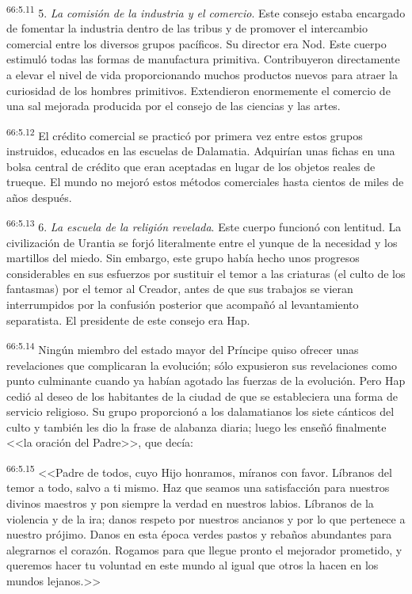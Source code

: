 \par
\textsuperscript{66:5.11} 5. \textit{La comisión de la industria y el comercio}. Este consejo estaba encargado de fomentar la industria dentro de las tribus y de promover el intercambio comercial entre los diversos grupos pacíficos. Su director era Nod. Este cuerpo estimuló todas las formas de manufactura primitiva. Contribuyeron directamente a elevar el nivel de vida proporcionando muchos productos nuevos para atraer la curiosidad de los hombres primitivos. Extendieron enormemente el comercio de una sal mejorada producida por el consejo de las ciencias y las artes.

\par
\textsuperscript{66:5.12} El crédito comercial se practicó por primera vez entre estos grupos instruidos, educados en las escuelas de Dalamatia. Adquirían unas fichas en una bolsa central de crédito que eran aceptadas en lugar de los objetos reales de trueque. El mundo no mejoró estos métodos comerciales hasta cientos de miles de años después.

\par
\textsuperscript{66:5.13} 6. \textit{La escuela de la religión revelada}. Este cuerpo funcionó con lentitud. La civilización de Urantia se forjó literalmente entre el yunque de la necesidad y los martillos del miedo. Sin embargo, este grupo había hecho unos progresos considerables en sus esfuerzos por sustituir el temor a las criaturas (el culto de los fantasmas) por el temor al Creador, antes de que sus trabajos se vieran interrumpidos por la confusión posterior que acompañó al levantamiento separatista. El presidente de este consejo era Hap.

\par
\textsuperscript{66:5.14} Ningún miembro del estado mayor del Príncipe quiso ofrecer unas revelaciones que complicaran la evolución; sólo expusieron sus revelaciones como punto culminante cuando ya habían agotado las fuerzas de la evolución. Pero Hap cedió al deseo de los habitantes de la ciudad de que se estableciera una forma de servicio religioso. Su grupo proporcionó a los dalamatianos los siete cánticos del culto y también les dio la frase de alabanza diaria; luego les enseñó finalmente <<la oración del Padre>>, que decía:

\par
\textsuperscript{66:5.15} <<Padre de todos, cuyo Hijo honramos, míranos con favor. Líbranos del temor a todo, salvo a ti mismo. Haz que seamos una satisfacción para nuestros divinos maestros y pon siempre la verdad en nuestros labios. Líbranos de la violencia y de la ira; danos respeto por nuestros ancianos y por lo que pertenece a nuestro prójimo. Danos en esta época verdes pastos y rebaños abundantes para alegrarnos el corazón. Rogamos para que llegue pronto el mejorador prometido, y queremos hacer tu voluntad en este mundo al igual que otros la hacen en los mundos lejanos.>>

